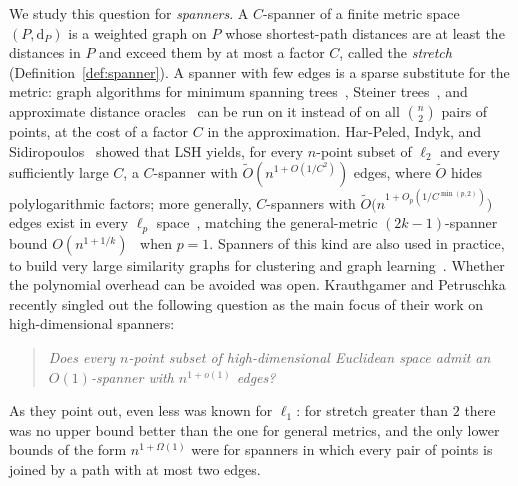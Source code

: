 \documentclass[11pt]{article}
\theoremstyle{definition}
\theoremstyle{remark}
\newcommand{\dP}{\mathrm{d}_P}
\begin{document}
We study this question for \emph{spanners}. A $C$-spanner of a finite metric space $(P, \dP)$ is a weighted graph on $P$ whose shortest-path distances are at least the distances in $P$ and exceed them by at most a factor $C$, called the \emph{stretch} (Definition~\ref{def:spanner}). A spanner with few edges is a sparse substitute for the metric: graph algorithms for minimum spanning trees~\cite{harpeled2013euclidean,filtser2022light}, Steiner trees~\cite{kou1981fast,mehlhorn1988faster}, and approximate distance oracles~\cite{thorup2005approximate} can be run on it instead of on all $\binom{n}{2}$ pairs of points, at the cost of a factor $C$ in the approximation. Har-Peled, Indyk, and Sidiropoulos~\cite{harpeled2013euclidean} showed that LSH yields, for every $n$-point subset of $\ell_2$ and every sufficiently large $C$, a $C$-spanner with $\tilde{O}(n^{1 + O(1/C^2)})$ edges, where $\tilde{O}$ hides polylogarithmic factors; more generally, $C$-spanners with $\tilde{O}\bigl(n^{1 + O_p(1/C^{\min(p, 2)})}\bigr)$ edges exist in every $\ell_p$ space~\cite{althofer1993sparse,filtser2022light,krauthgamer2025lipschitz,krauthgamer2025power}, matching the general-metric $(2k - 1)$-spanner bound $O(n^{1 + 1/k})$~\cite{althofer1993sparse} when $p = 1$. Spanners of this kind are also used in practice, to build very large similarity graphs for clustering and graph learning~\cite{carey2022stars}. Whether the polynomial overhead can be avoided was open. Krauthgamer and Petruschka~\cite[Question~1.1]{krauthgamer2026towards} recently singled out the following question as the main focus of their work on high-dimensional spanners:
\begin{quote}
\emph{Does every $n$-point subset of high-dimensional Euclidean space admit an $O(1)$-spanner with $n^{1 + o(1)}$ edges?}
\end{quote}
As they point out, even less was known for $\ell_1$: for stretch greater than $2$ there was no upper bound better than the one for general metrics, and the only lower bounds of the form $n^{1 + \Omega(1)}$ were for spanners in which every pair of points is joined by a path with at most two edges.
\end{document}

